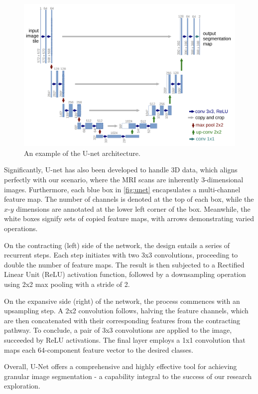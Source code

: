 \begin{figure}[htp]
    \centering
    \includegraphics[width=\textwidth]{./figures/unet.png}
    \caption{An example of the U-net architecture.}
    \label{fig:unet}
\end{figure}

Significantly, U-net has also been developed to handle 3D data, which aligns perfectly with our scenario, where the MRI scans are inherently 3-dimensional images. Furthermore, each blue box in \autoref{fig:unet} encapsulates a multi-channel feature map. The number of channels is denoted at the top of each box, while the \(x\)-\(y\) dimensions are annotated at the lower left corner of the box. Meanwhile, the white boxes signify sets of copied feature maps, with arrows demonstrating varied operations.

On the contracting (left) side of the network, the design entails a series of recurrent steps. Each step initiates with two 3x3 convolutions, proceeding to double the number of feature maps. The result is then subjected to a Rectified Linear Unit (ReLU) activation function, followed by a downsampling operation using 2x2 max pooling with a stride of 2.

On the expansive side (right) of the network, the process commences with an upsampling step. A 2x2 convolution follows, halving the feature channels, which are then concatenated with their corresponding features from the contracting pathway. To conclude, a pair of 3x3 convolutions are applied to the image, succeeded by ReLU activations. The final layer employs a 1x1 convolution that maps each 64-component feature vector to the desired classes.

Overall, U-Net offers a comprehensive and highly effective tool for achieving granular image segmentation - a capability integral to the success of our research exploration.

